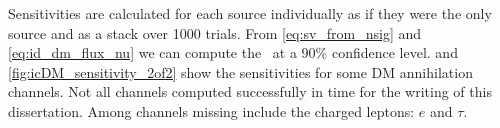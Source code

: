 Sensitivities are calculated for each source individually as if they were the only source and as a stack over 1000 trials.
From \cref{eq:sv_from_nsig} and \cref{eq:id_dm_flux_nu} we can compute the \sv~at a 90\% confidence level.
 and \cref{fig:icDM_sensitivity_2of2} show the sensitivities for some DM annihilation channels.
Not all channels computed successfully in time for the writing of this dissertation.
Among channels missing include the charged leptons: $e$ and $\tau$.

\begin{figure}[h]
\end{figure}
